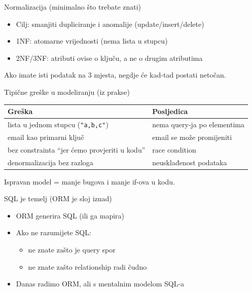 	\begin{frame}{Normalizacija (minimalno što trebate znati)}
		\begin{itemize}
			\item Cilj: smanjiti dupliciranje i anomalije (update/insert/delete)
			\item 1NF: atomarne vrijednosti (nema lista u stupcu)
			\item 2NF/3NF: atributi ovise o ključu, a ne o drugim atributima
		\end{itemize}
		
		\vspace{0.6em}
		Ako imate isti podatak na 3 mjesta, negdje će kad-tad postati netočan.
	\end{frame}
	
	\begin{frame}{Tipične greške u modeliranju (iz prakse)}
		\begin{center}
			\small
			\begin{tabular}{ll}
				\toprule
				\textbf{Greška} & \textbf{Posljedica} \\
				\midrule
				lista u jednom stupcu (\texttt{"a,b,c"}) & nema query-ja po elementima \\
				email kao primarni ključ & email se može promijeniti \\
				bez constrainta \enquote{jer ćemo provjeriti u kodu} & race condition \\
				denormalizacija bez razloga & neusklađenost podataka \\
				\bottomrule
			\end{tabular}
		\end{center}

		\vspace{0.6em}
		Ispravan model = manje bugova i manje if-ova u kodu.
	\end{frame}
	
	\begin{frame}{SQL je temelj (ORM je sloj iznad)}
		\begin{itemize}
			\item ORM generira SQL (ili ga mapira)
			\item Ako ne razumijete SQL:
			\begin{itemize}
				\item ne znate zašto je query spor
				\item ne znate zašto relationship radi čudno
			\end{itemize}
			\item Danas radimo ORM, ali s mentalnim modelom SQL-a
		\end{itemize}
	\end{frame}
	
